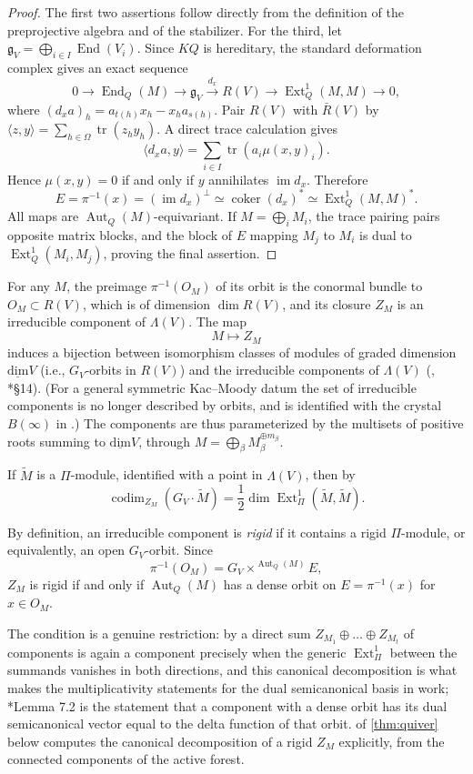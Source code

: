 \documentclass[12pt]{article}
\newcommand{\Lieg}{\mathfrak{g}}
\newcommand{\Ext}{\operatorname{Ext}}
\newcommand{\End}{\operatorname{End}}
\newcommand{\Aut}{\operatorname{Aut}}
\newcommand{\tr}{\operatorname{tr}}
\newcommand{\dimv}{\operatorname{\underline{dim}}}
\begin{document}
\begin{proof}
The first two assertions follow directly from the definition of the
preprojective algebra and of the stabilizer.  For the third, let
$\Lieg_V=\bigoplus_{i\in I}\End(V_i)$.  Since $KQ$ is hereditary, the standard
deformation complex gives an exact sequence
\[
 0\longrightarrow\End_Q(M)\longrightarrow\Lieg_V
 \xrightarrow{d_x}R(V)\longrightarrow\Ext^1_Q(M,M)\longrightarrow0,
\]
where $(d_xa)_h=a_{t(h)}x_h-x_ha_{s(h)}$.  Pair $R(V)$ with $\bar R(V)$ by
$\langle z,y\rangle=\sum_{h\in\Omega}\tr(z_hy_h)$.  A direct trace
calculation gives
\[
 \langle d_xa,y\rangle=\sum_{i\in I}\tr(a_i\mu(x,y)_i).
\]
Hence $\mu(x,y)=0$ if and only if $y$ annihilates $\operatorname{im}d_x$.  Therefore
\[
 E=\pi^{-1}(x)=(\operatorname{im}d_x)^\perp
   \simeq\operatorname{coker}(d_x)^*
   \simeq\Ext^1_Q(M,M)^*.
\]
All maps are $\Aut_Q(M)$-equivariant.  If $M=\bigoplus_iM_i$, the trace pairing pairs
opposite matrix blocks, and the block of $E$ mapping $M_j$ to $M_i$ is dual to
$\Ext^1_Q(M_i,M_j)$, proving the final assertion.
\end{proof}


For any $M$, the preimage $\pi^{-1}(O_M)$ of its orbit is the conormal bundle to $O_M\subset R(V)$, which is of dimension $\dim R(V)$, and its closure $Z_M$
is an irreducible component of $\Lambda(V)$. The map
\[
M\mapsto Z_M
\]
induces a bijection between isomorphism classes of modules of graded dimension $\dimv V$
(i.e., $G_V$-orbits in $R(V)$) and the irreducible components of $\Lambda(V)$ (\cite{MR0390138}, \cite{MR1088333}*{\S14}).
(For a general symmetric Kac--Moody datum the set of irreducible components is no longer described by
orbits, and is identified with the crystal $B(\infty)$ in \cite{MR1458969}.)
The components are thus parameterized by the multisets of positive roots summing to $\dimv V$, through
$M=\bigoplus_{\beta}M_\beta^{\oplus m_\beta}$.

If $\tilde M$ is a $\Pi$-module, identified with a point in $\Lambda(V)$, then by \cite{MR1834739}
\[
\operatorname{codim}_{Z_M}(G_V\cdot\tilde M)=\frac12\dim\Ext_\Pi^1(\tilde M,\tilde M).
\]

By definition, an irreducible component is \emph{rigid} if it contains a rigid $\Pi$-module, or equivalently,
an open $G_V$-orbit. Since
\[
\pi^{-1}(O_M)=G_V\times^{\Aut_Q(M)}E,
\]
$Z_M$ is rigid if and only if $\Aut_Q(M)$ has a dense orbit on $E=\pi^{-1}(x)$ for $x\in O_M$.

The condition is a genuine restriction: by \cite{MR1944812} a direct sum $Z_{M_1}\oplus\dots\oplus Z_{M_t}$
of components is again a component precisely when the generic $\Ext^1_\Pi$ between the summands vanishes
in both directions, and this canonical decomposition is what makes the multiplicativity statements for the
dual semicanonical basis in \cite{MR2144987} work; \cite{MR2144987}*{Lemma 7.2} is the statement that a
component with a dense orbit has its dual semicanonical vector equal to the delta function of that orbit.
 of \cref{thm:quiver} below computes the canonical decomposition of a rigid
$Z_M$ explicitly, from the connected components of the active forest.
\end{document}
